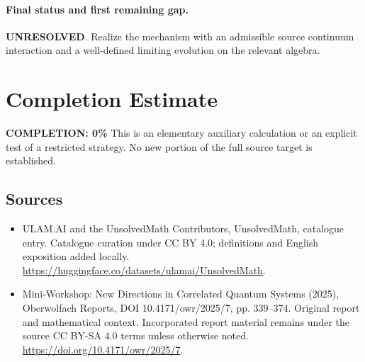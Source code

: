 \documentclass[11pt]{article}
\begin{document}
\paragraph{Final status and first remaining gap.}
\textbf{UNRESOLVED}. Realize the mechanism with an admissible source continuum interaction and a well-defined limiting evolution on the relevant algebra.

\section{Completion Estimate}
\noindent\textbf{COMPLETION: 0\%}
This is an elementary auxiliary calculation or an explicit test of a restricted strategy. No new portion of the full source target is established.

\subsection{Sources}
\begin{itemize}
\item[\hypertarget{source:statement:1}{S1}] ULAM.AI and the UnsolvedMath Contributors, UnsolvedMath, catalogue entry. Catalogue curation under CC BY 4.0; definitions and English exposition added locally.
\url{https://huggingface.co/datasets/ulamai/UnsolvedMath}.
\item[\hypertarget{source:statement:2}{S2}] Mini-Workshop: New Directions in Correlated Quantum Systems (2025), Oberwolfach Reports, DOI 10.4171/owr/2025/7, pp. 339--374. Original report and mathematical context. Incorporated report material remains under the source CC BY-SA 4.0 terms unless otherwise noted.
\url{https://doi.org/10.4171/owr/2025/7}.
\end{itemize}
\label{end:statement}
\end{document}
